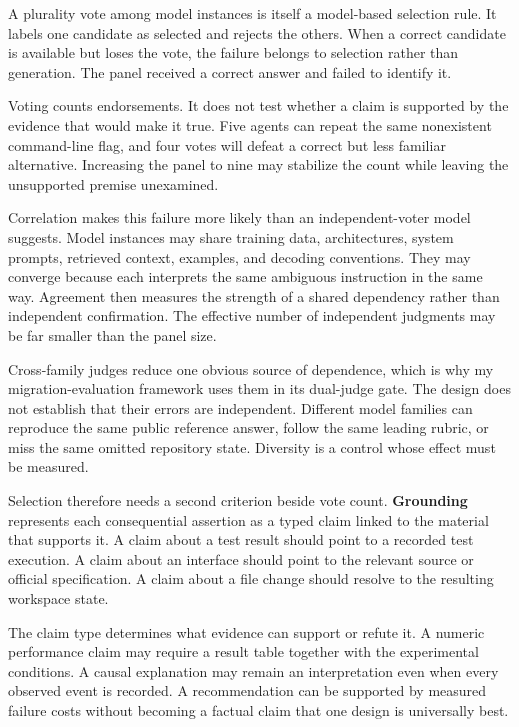 A plurality vote among model instances is itself a model-based selection rule. It labels one candidate as selected and rejects the others. When a correct candidate is available but loses the vote, the failure belongs to selection rather than generation. The panel received a correct answer and failed to identify it.

Voting counts endorsements. It does not test whether a claim is supported by the evidence that would make it true. Five agents can repeat the same nonexistent command-line flag, and four votes will defeat a correct but less familiar alternative. Increasing the panel to nine may stabilize the count while leaving the unsupported premise unexamined.

Correlation makes this failure more likely than an independent-voter model suggests. Model instances may share training data, architectures, system prompts, retrieved context, examples, and decoding conventions. They may converge because each interprets the same ambiguous instruction in the same way. Agreement then measures the strength of a shared dependency rather than independent confirmation. The effective number of independent judgments may be far smaller than the panel size.

Cross-family judges reduce one obvious source of dependence, which is why my migration-evaluation framework uses them in its dual-judge gate. The design does not establish that their errors are independent. Different model families can reproduce the same public reference answer, follow the same leading rubric, or miss the same omitted repository state. Diversity is a control whose effect must be measured.

Selection therefore needs a second criterion beside vote count. \textbf{Grounding} represents each consequential assertion as a typed claim linked to the material that supports it. A claim about a test result should point to a recorded test execution. A claim about an interface should point to the relevant source or official specification. A claim about a file change should resolve to the resulting workspace state.

The claim type determines what evidence can support or refute it. A numeric performance claim may require a result table together with the experimental conditions. A causal explanation may remain an interpretation even when every observed event is recorded. A recommendation can be supported by measured failure costs without becoming a factual claim that one design is universally best.

